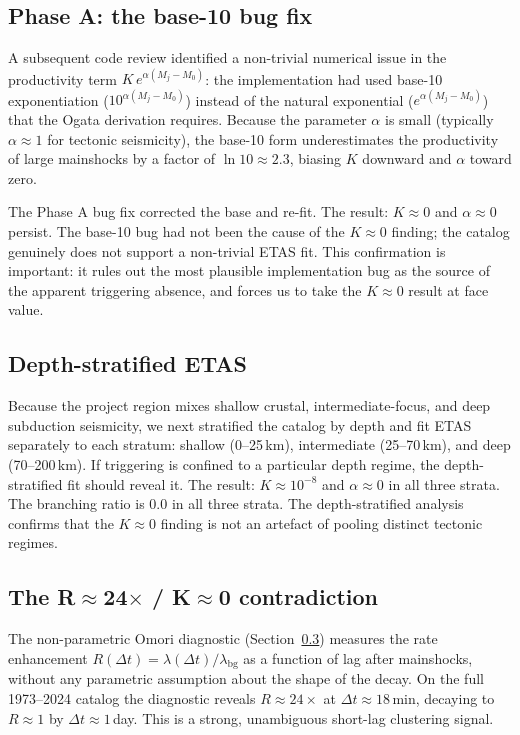 \documentclass[10pt,a4paper,twocolumn]{article}
\begin{document}
\subsection{Phase A: the base-10 bug fix}

A subsequent code review identified a non-trivial numerical issue in the productivity term $K\,e^{\alpha(M_j - M_0)}$: the implementation had used base-10 exponentiation ($10^{\alpha(M_j-M_0)}$) instead of the natural exponential ($e^{\alpha(M_j-M_0)}$) that the Ogata derivation requires. Because the parameter $\alpha$ is small (typically $\alpha\approx1$ for tectonic seismicity), the base-10 form underestimates the productivity of large mainshocks by a factor of $\ln 10 \approx 2.3$, biasing $K$ downward and $\alpha$ toward zero.

The Phase A bug fix corrected the base and re-fit. The result: $K\approx0$ and $\alpha\approx0$ persist. The base-10 bug had not been the cause of the $K\approx0$ finding; the catalog genuinely does not support a non-trivial ETAS fit. This confirmation is important: it rules out the most plausible implementation bug as the source of the apparent triggering absence, and forces us to take the $K\approx0$ result at face value.

\subsection{Depth-stratified ETAS}

Because the project region mixes shallow crustal, intermediate-focus, and deep subduction seismicity, we next stratified the catalog by depth and fit ETAS separately to each stratum: shallow (0--25\,km), intermediate (25--70\,km), and deep (70--200\,km). If triggering is confined to a particular depth regime, the depth-stratified fit should reveal it. The result: $K\approx10^{-8}$ and $\alpha\approx0$ in all three strata. The branching ratio is 0.0 in all three strata. The depth-stratified analysis confirms that the $K\approx0$ finding is not an artefact of pooling distinct tectonic regimes.

\subsection{The R$\approx$24$\times$ / K$\approx$0 contradiction}\label{sec:omori}

The non-parametric Omori diagnostic (Section~\ref{sec:omori}) measures the rate enhancement $R(\Delta t) = \lambda(\Delta t) / \lambda_{\text{bg}}$ as a function of lag after mainshocks, without any parametric assumption about the shape of the decay. On the full 1973--2024 catalog the diagnostic reveals $R\approx24\times$ at $\Delta t\approx18$\,min, decaying to $R\approx1$ by $\Delta t\approx1$\,day. This is a strong, unambiguous short-lag clustering signal.
\end{document}
